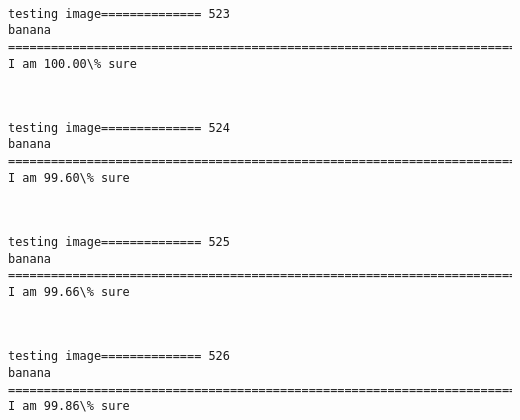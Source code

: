 \documentclass[11pt]{article}
\begin{document}
    \begin{center}
    \end{center}
    { \hspace*{\fill} \\}
    
    \begin{Verbatim}[commandchars=\\\{\}]
testing image============== 523
banana
============================================================================
I am 100.00\% sure

    \end{Verbatim}

    \begin{center}
    \end{center}
    { \hspace*{\fill} \\}
    
    \begin{Verbatim}[commandchars=\\\{\}]
testing image============== 524
banana
============================================================================
I am 99.60\% sure

    \end{Verbatim}

    \begin{center}
    \end{center}
    { \hspace*{\fill} \\}
    
    \begin{Verbatim}[commandchars=\\\{\}]
testing image============== 525
banana
============================================================================
I am 99.66\% sure

    \end{Verbatim}

    \begin{center}
    \end{center}
    { \hspace*{\fill} \\}
    
    \begin{Verbatim}[commandchars=\\\{\}]
testing image============== 526
banana
============================================================================
I am 99.86\% sure

    \end{Verbatim}
\end{document}

